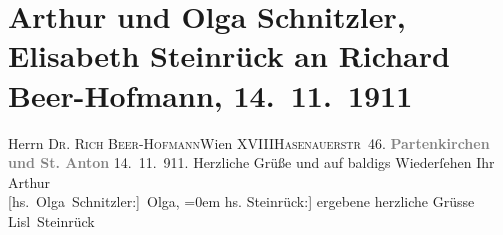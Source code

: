 

         
         \renewcommand{\erwaehntePersonen}{Personen: Richard Beer-Hofmann, Olga Schnitzler, Elisabeth Steinrück}
         \renewcommand{\erwaehnteOrte}{Orte: Garmisch-Partenkirchen, Hasenauerstraße, Partenkirchen, St. Anton, Wien, XVIII., Währing}
         \renewcommand{\erwaehnteWerke}{}
               \section[Arthur und Olga Schnitzler, Elisabeth Steinrück an Richard Beer-Hofmann, 14. 11. 1911]{ Arthur und Olga Schnitzler, Elisabeth Steinrück an Richard
               Beer-Hofmann, 14. 11. 1911}\nopagebreak{}\rehead{ }\begin{ledgroupsized}[t]{13cm}\normalsize\beginnumbering \toendnotes[C]{\smallbreak\pagebreak[2]} 
\pstart{}{\pb}Herrn \textsc{Dr. Rich
                     Beer-Hofmann}\pend{}\pstart{}Wien XVIII\pend{}\pstart{}\textsc{Hasenauerstr 46.}\pend{}{\bigskip}\pstart
           \noindent{}\centering{}{\pb}\textcolor{gray}{\textbf{Partenkirchen und St. Anton}}\pend
           \pstart
           {\pb}14. 11. 911.\pend
           \pstart
           Herzliche Grüße und auf baldigs Wiederſehen\pend
           \pstart
           Ihr \spacefill\mbox{Arthur}{\\[\baselineskip]}\spacefill\mbox{{[}hs. Olga Schnitzler:{]} Olga,}\pend
           \leftskip=0em{}\pstart
           \noindent{}{[}hs. Steinrück:{]} ergebene herzliche Grüsse\pend
           \pstart \spacefill\mbox{Lisl Steinrück}\pend{}
         
         \endnumbering{}\end{ledgroupsized}  \newcommand{\dateiname}{L02045}\newcommand{\titel}{Arthur und Olga Schnitzler, Elisabeth Steinrück an Richard Beer-Hofmann, 14. 11. 1911}\newcommand{\editorInnen}{Martin Anton Müller und Gerd-Hermann Susen}
      